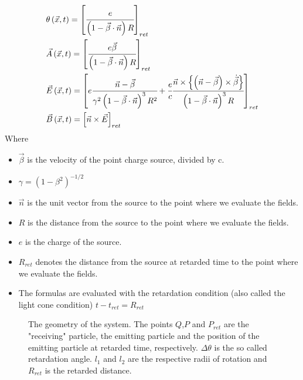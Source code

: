\documentclass[11pt,a4paper]{article}
\begin{document}
\begin{subequations}
\begin{align}
&\theta\left(\vec{x},t\right)=\left[\cfrac{e}{\left(1-\vec{\beta}\cdot\vec{n}\right)R}\right]_{ret}\\
&\vec{A}\left(\vec{x},t\right)=\left[\cfrac{e\vec{\beta}}{\left(1-\vec{\beta}\cdot\vec{n}\right)R}\right]_{ret}\\
&\vec{E}\left(\vec{x},t\right)=\left[e\cfrac{\vec{n}-\vec{\beta}}{\gamma^{2}\left(1-\vec{\beta}\cdot\vec{n}\right)^{3}R^{2}}+\cfrac{e}{c}\cfrac{\vec{n}\times\left\{ \left(\vec{n}-\vec{\beta}\right)\times\dot{\vec{\beta}}\right\} }{\left(1-\vec{\beta}\cdot\vec{n}\right)^{3}R}\right]_{ret}\\
&\vec{B}\left(\vec{x},t\right)=\left[\vec{n}\times\vec{E}\right]_{ret}
\end{align}
\end{subequations}
Where 
\begin{itemize}
\item $\vec{\beta} $ is the velocity of the point charge source, divided by c.
\item $\gamma=\left(1-\beta^{2}\right)^{-1/2}$
\item $\vec{n}$ is the unit vector from the source to the point where we evaluate the fields.
\item $R$ is the distance from the source to the point where we evaluate the fields.
\item $e$ is the charge of the source.
\item $R_{ret}$ denotes the distance from the source at retarded time to the point where we evaluate the fields.
\item The formulas are evaluated with the retardation condition (also called the light cone condition) $t-t_{ret}=R_{ret}$
\end{itemize}
\begin{figure}[h]
\centering
{}
\caption{The geometry of the system. The points $Q$,$P$ and $P_{ret}$ are the "receiving" particle, the emitting particle and the position of the emitting particle at retarded time, respectively. $\Delta\theta$ is the so called retardation angle. $l_1$ and $l_2$ are the respective radii of rotation and $R_{ret}$ is the retarded distance.}
\label{fig:geometry}
\end{figure}
\end{document}
